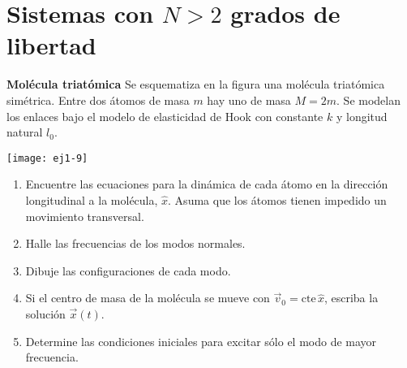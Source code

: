\section*{Sistemas con \(N> 2\) grados de libertad}


\item
\begin{minipage}[t][1.2cm]{0.75\textwidth}
\textbf{Molécula triatómica}
Se esquematiza en la figura una molécula triatómica simétrica.
Entre dos átomos de masa $m$ hay uno de masa $M = 2 m$.
Se modelan los enlaces bajo el modelo de elasticidad de Hook con constante $k$ y longitud natural $l_0$.
\end{minipage}
\begin{minipage}[c][1cm][t]{0.2\textwidth}
  \texttt{[image: ej1-9]}
\end{minipage}
\begin{enumerate}
	\item Encuentre las ecuaciones para la dinámica de cada átomo en la dirección longitudinal a la molécula, \(\hat{x}\).
	Asuma que los átomos tienen impedido un movimiento transversal.
	\item Halle las frecuencias de los modos normales. 
	\item Dibuje las configuraciones de cada modo. 
	\item Si el centro de masa de la molécula se mueve con $\vec{v}_0 = \mathrm{cte}\, \hat{x}$, escriba la solución $\vec{x}(t)$.
	\item Determine las condiciones iniciales para excitar sólo el modo de mayor frecuencia.
\end{enumerate}



